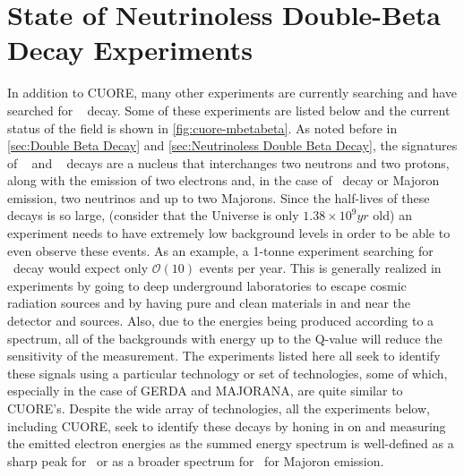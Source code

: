 \section{State of Neutrinoless Double-Beta Decay Experiments}
\label{sec:State of Neutrinoless Double Beta Decay Experiments}
In addition to CUORE, many other experiments are currently searching and have searched for \zeronubb~ decay. Some of these experiments are listed below and the current status of the field is shown in \autoref{fig:cuore-mbetabeta}. As noted before in \autoref{sec:Double Beta Decay} and \autoref{sec:Neutrinoless Double Beta Decay}, the signatures of \zeronubb~ and \twonubb~ decays are a nucleus that interchanges two neutrons and two protons, along with the emission of two electrons and, in the case of \twonubb~decay or Majoron emission, two neutrinos and up to two Majorons. Since the half-lives of these decays is so large, (consider that the Universe is only $1.38\times10^{9} yr$ old) an experiment needs to have extremely low background levels in order to be able to even observe these events. As an example, a 1-tonne experiment searching for \zeronubb~decay would expect only $\mathcal{O}(10)$ events per year.  This is generally realized in experiments by going to deep underground laboratories to escape cosmic radiation sources and by having pure and clean materials in and near the detector and sources. Also, due to the energies being produced according to a spectrum, all of the backgrounds with energy up to the Q-value will reduce the sensitivity of the measurement. The experiments listed here all seek to identify these signals using a particular technology or set of technologies, some of which, especially in the case of GERDA and MAJORANA, are quite similar to CUORE's. Despite the wide array of technologies, all the experiments below, including CUORE, seek to identify these decays by honing in on and measuring the emitted electron energies as the summed energy spectrum is well-defined as a sharp peak for \zeronubb~or as a broader spectrum for \twonubb~for Majoron emission.


